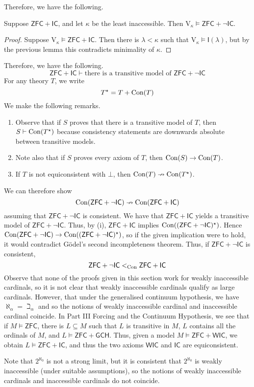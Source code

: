 Therefore, we have the following.
\begin{theorem}
    Suppose \( \mathsf{ZFC} + \mathsf{IC} \), and let \( \kappa \) be the least inaccessible.
    Then \( \mathrm{V}_\kappa \vDash \mathsf{ZFC} + \neg\mathsf{IC} \).
\end{theorem}
\begin{proof}
    Suppose \( \mathrm{V}_\kappa \vDash \mathsf{ZFC} + \mathsf{IC} \).
    Then there is \( \lambda < \kappa \) such that \( \mathrm{V}_\kappa \vDash \mathsf{I}(\lambda) \), but by the previous lemma this contradicts minimality of \( \kappa \).
\end{proof}
Therefore, we have the following.
\[ \mathsf{ZFC} + \mathsf{IC} \vdash \text{there is a transitive model of } \mathsf{ZFC} + \neg\mathsf{IC} \]
For any theory \( T \), we write
\[ T^\star = T + \operatorname{Con}(T) \]
We make the following remarks.
\begin{enumerate}
    \item Observe that if \( S \) proves that there is a transitive model of \( T \), then \( S \vdash \operatorname{Con}(T^\star) \) because consistency statements are downwards absolute between transitive models.
    \item Note also that if \( S \) proves every axiom of \( T \), then \( \operatorname{Con}(S) \to \operatorname{Con}(T) \).
    \item If \( T \) is not equiconsistent with \( \bot \), then \( \operatorname{Con}(T) \nrightarrow \operatorname{Con}(T^\star) \).
\end{enumerate}
We can therefore show
\[ \operatorname{Con}(\mathsf{ZFC} + \neg\mathsf{IC}) \nrightarrow \operatorname{Con}(\mathsf{ZFC} + \mathsf{IC}) \]
assuming that \( \mathsf{ZFC} + \neg\mathsf{IC} \) is consistent.
We have that \( \mathsf{ZFC} + \mathsf{IC} \) yields a transitive model of \( \mathsf{ZFC} + \neg\mathsf{IC} \).
Thus, by (i), \( \mathsf{ZFC} + \mathsf{IC} \) implies \( \operatorname{Con}((\mathsf{ZFC} + \neg\mathsf{IC})^\star) \).
Hence \( \operatorname{Con}(\mathsf{ZFC} + \neg\mathsf{IC}) \to \operatorname{Con}((\mathsf{ZFC} + \neg\mathsf{IC})^\star) \), so if the given implication were to hold, it would contradict G\"odel's second incompleteness theorem.
Thus, if \( \mathsf{ZFC} + \neg\mathsf{IC} \) is consistent,
\[ \mathsf{ZFC} + \neg\mathsf{IC} <_{\operatorname{Con}} \mathsf{ZFC} + \mathsf{IC} \]
Observe that none of the proofs given in this section work for weakly inaccessible cardinals, so it is not clear that weakly inaccessible cardinals qualify as large cardinals.
However, that under the generalised continuum hypothesis, we have \( \aleph_\alpha = \beth_\alpha \) and so the notions of weakly inaccessible cardinal and inaccessible cardinal coincide.
In Part III Forcing and the Continuum Hypothesis, we see that if \( M \vDash \mathsf{ZFC} \), there is \( L \subseteq M \) such that \( L \) is transitive in \( M \), \( L \) contains all the ordinals of \( M \), and \( L \vDash \mathsf{ZFC} + \mathsf{GCH} \).
Thus, given a model \( M \vDash \mathsf{ZFC} + \mathsf{WIC} \), we obtain \( L \vDash \mathsf{ZFC} + \mathsf{IC} \), and thus the two axioms \( \mathsf{WIC} \) and \( \mathsf{IC} \) are equiconsistent.

Note that \( 2^{\aleph_0} \) is not a strong limit, but it is consistent that \( 2^{\aleph_0} \) is weakly inaccessible (under suitable assumptions), so the notions of weakly inaccessible cardinals and inaccessible cardinals do not coincide.
